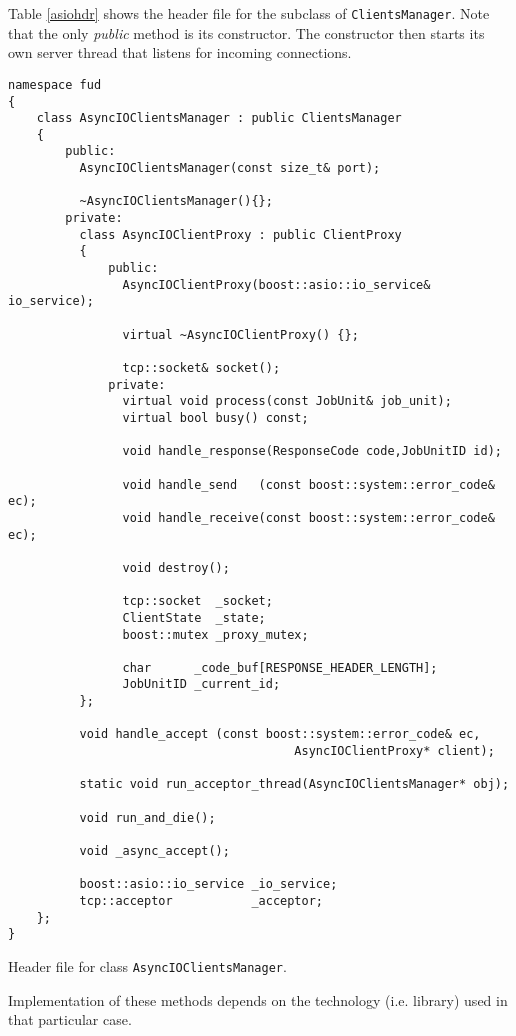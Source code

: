 \documentclass[a4paper,12pt,english]{article}
\newcommand{\CM}{\texttt{ClientsManager}}
\begin{document}
Table \ref{asiohdr} shows the header file for the subclass of \CM. Note that the only \emph{public} method is its constructor. The constructor then starts its own server thread that listens for incoming connections. 

\begin{table}[!htb]
\lstset{language=C++}%
\begin{lstlisting}[frame=single]
namespace fud
{
    class AsyncIOClientsManager : public ClientsManager
    {
        public:
          AsyncIOClientsManager(const size_t& port);

          ~AsyncIOClientsManager(){};
        private:
          class AsyncIOClientProxy : public ClientProxy
          {
              public:
                AsyncIOClientProxy(boost::asio::io_service& io_service);

                virtual ~AsyncIOClientProxy() {};

                tcp::socket& socket();
              private:
                virtual void process(const JobUnit& job_unit);
                virtual bool busy() const;

                void handle_response(ResponseCode code,JobUnitID id);

                void handle_send   (const boost::system::error_code& ec);
                void handle_receive(const boost::system::error_code& ec);

                void destroy();

                tcp::socket  _socket;
                ClientState  _state;
                boost::mutex _proxy_mutex;

                char      _code_buf[RESPONSE_HEADER_LENGTH];
                JobUnitID _current_id;
          };

          void handle_accept (const boost::system::error_code& ec,
                                        AsyncIOClientProxy* client);

          static void run_acceptor_thread(AsyncIOClientsManager* obj);

          void run_and_die();

          void _async_accept();

          boost::asio::io_service _io_service;
          tcp::acceptor           _acceptor;
    };
}
\end{lstlisting}
\centering \caption{Header file for class \texttt{AsyncIOClientsManager}.} \label{asiohdr}
\end{table}

Implementation of these methods depends on the technology (i.e. library) used in that particular case. 


\clearpage

\vfill



\end{document}
